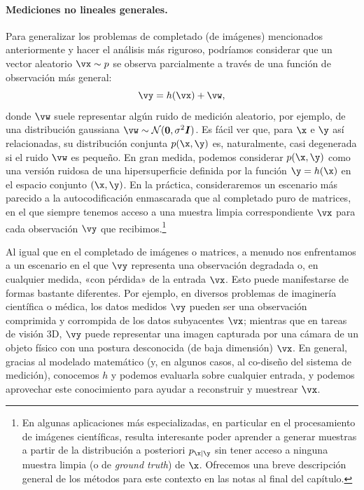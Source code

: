 \documentclass[../../book-main_es.tex]{subfiles}
\begin{document}
\paragraph{Mediciones no lineales generales.}
Para generalizar los problemas de completado (de imágenes) mencionados anteriormente y hacer el análisis
más riguroso, podríamos considerar que un vector aleatorio $\vx \sim p$ se
observa parcialmente a través de una función de observación más
general:
\begin{equation}\label{eq:measurement-matching-observation}
    \vy = h(\vx) + \vw,
\end{equation}
donde $\vw$ suele representar algún ruido de medición aleatorio, por ejemplo, de
una distribución gaussiana $\vw \sim \mathcal{N}(\mathbf{0}, \sigma^2
\boldsymbol{I})$. Es fácil ver que, para $\x$ e $\y$ así
relacionadas, su distribución conjunta $p(\x, \y)$ es, naturalmente, casi
degenerada si el ruido $\vw$ es pequeño. En gran medida, podemos
considerar $p(\x, \y)$ como una versión ruidosa de una hipersuperficie definida por la
función $\y = h(\x)$ en el espacio conjunto $(\x, \y)$. En la práctica,
consideraremos un escenario más parecido a la autocodificación enmascarada
que al completado puro de matrices, en el que siempre tenemos acceso a una
muestra limpia correspondiente $\vx$ para cada observación $\vy$ que
recibimos.\footnote{En algunas aplicaciones más especializadas, en
    particular en el procesamiento de imágenes científicas, resulta interesante poder
    aprender a generar muestras a partir de la distribución a posteriori $p_{\x \mid \y}$ sin
    tener acceso a ninguna muestra limpia (o de \textit{ground truth}) de $\x$. Ofrecemos una breve
descripción general de los métodos para este contexto en las notas al final del capítulo.}

Al igual que en el completado de imágenes o matrices,
a menudo nos enfrentamos a un escenario en el que $\vy$ representa una observación degradada o, 
en cualquier medida, «con pérdida» de la entrada $\vx$. Esto puede manifestarse de formas bastante 
diferentes. Por ejemplo, en diversos problemas de imaginería científica o
médica, los datos medidos $\vy$ pueden ser una observación comprimida y 
corrompida de los datos subyacentes $\vx$; mientras que en tareas de visión 3D,
$\vy$ puede representar una imagen capturada por una cámara de un objeto físico con una
postura desconocida (de baja dimensión) $\vx$. En general, gracias al modelado matemático 
(y, en algunos casos, al co-diseño del sistema de medición), conocemos $h$ y podemos 
evaluarla sobre cualquier entrada, y podemos aprovechar este conocimiento para ayudar 
a reconstruir y muestrear $\vx$.
\end{document}
